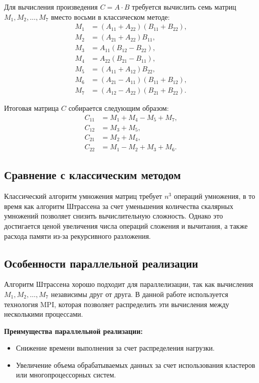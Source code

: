 \documentclass[a4paper, 14pt]{extarticle}
\begin{document}
Для вычисления произведения \(C = A \cdot B\) требуется вычислить семь матриц \(M_1, M_2, \dots, M_7\) вместо восьми в классическом методе:
\[
\begin{aligned}
M_1 &= (A_{11} + A_{22})(B_{11} + B_{22}), \\
M_2 &= (A_{21} + A_{22})B_{11}, \\
M_3 &= A_{11}(B_{12} - B_{22}), \\
M_4 &= A_{22}(B_{21} - B_{11}), \\
M_5 &= (A_{11} + A_{12})B_{22}, \\
M_6 &= (A_{21} - A_{11})(B_{11} + B_{12}), \\
M_7 &= (A_{12} - A_{22})(B_{21} + B_{22}).
\end{aligned}
\]

Итоговая матрица \(C\) собирается следующим образом:
\[
\begin{aligned}
C_{11} &= M_1 + M_4 - M_5 + M_7, \\
C_{12} &= M_3 + M_5, \\
C_{21} &= M_2 + M_4, \\
C_{22} &= M_1 - M_2 + M_3 + M_6.
\end{aligned}
\]

\subsection{Сравнение с классическим методом}
Классический алгоритм умножения матриц требует \(n^3\) операций умножения, в то время как алгоритм Штрассена за счет уменьшения количества скалярных умножений позволяет снизить вычислительную сложность. Однако это достигается ценой увеличения числа операций сложения и вычитания, а также расхода памяти из-за рекурсивного разложения.

\subsection{Особенности параллельной реализации}
Алгоритм Штрассена хорошо подходит для параллелизации, так как вычисления \(M_1, M_2, \dots, M_7\) независимы друг от друга. В данной работе используется технология MPI, которая позволяет распределить эти вычисления между несколькими процессами.

\textbf{Преимущества параллельной реализации:}
\begin{itemize}
    \item Снижение времени выполнения за счет распределения нагрузки.
    \item Увеличение объема обрабатываемых данных за счет использования кластеров или многопроцессорных систем.
\end{itemize}
\end{document}
